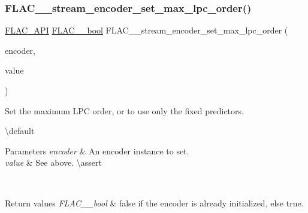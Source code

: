 \subsubsection{\texorpdfstring{FLAC\_\_stream\_encoder\_set\_max\_lpc\_order()}{FLAC\_\_stream\_encoder\_set\_max\_lpc\_order()}}
{\footnotesize\ttfamily \mbox{\hyperlink{group__flac__export_ga56ca07df8a23310707732b1c0007d6f5}{F\+L\+A\+C\+\_\+\+A\+PI}} \mbox{\hyperlink{ordinals_8h_a95103469f1cbd78b8cf250194985b34e}{F\+L\+A\+C\+\_\+\+\_\+bool}} F\+L\+A\+C\+\_\+\+\_\+stream\+\_\+encoder\+\_\+set\+\_\+max\+\_\+lpc\+\_\+order (\begin{DoxyParamCaption}\item[{\mbox{\hyperlink{struct_f_l_a_c_____stream_encoder}{F\+L\+A\+C\+\_\+\+\_\+\+Stream\+Encoder}} $\ast$}]{encoder,  }\item[{unsigned}]{value }\end{DoxyParamCaption})}

Set the maximum L\+PC order, or {} to use only the fixed predictors.

\textbackslash{}default {} 
\begin{DoxyParams}{Parameters}
{\em encoder} & An encoder instance to set. \\
\hline
{\em value} & See above. \textbackslash{}assert 
\begin{DoxyCode}{1}
\end{DoxyCode}
 \\
\hline
\end{DoxyParams}

\begin{DoxyRetVals}{Return values}
{\em F\+L\+A\+C\+\_\+\+\_\+bool} & {\ttfamily false} if the encoder is already initialized, else {\ttfamily true}. \\
\hline
\end{DoxyRetVals}
\mbox{\label{group__flac__stream__encoder_ga6de153da5a8eeeb1be2271c27fa58b37}} 
